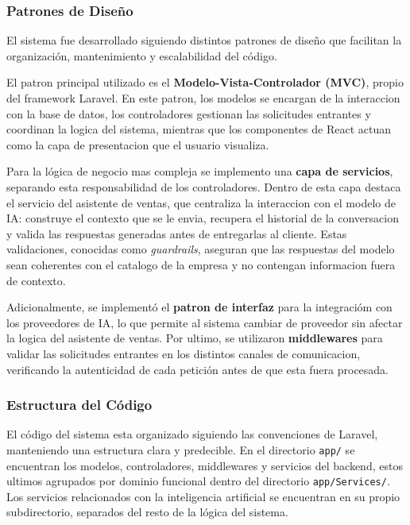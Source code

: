 \subsubsection{Patrones de Diseño}
\label{subsubsec:patrones_diseno}

El sistema fue desarrollado siguiendo distintos patrones de diseño que facilitan la organización, mantenimiento y escalabilidad del código.

El patron principal utilizado es el \textbf{Modelo-Vista-Controlador (MVC)}, propio del framework Laravel. En este patron, los modelos se encargan de la interaccion con la base de datos, los controladores gestionan las solicitudes entrantes y coordinan la logica del sistema, mientras que los componentes de React actuan como la capa de presentacion que el usuario visualiza.

Para la lógica de negocio mas compleja se implemento una \textbf{capa de servicios}, separando esta responsabilidad de los controladores. Dentro de esta capa destaca el servicio del asistente de ventas, que centraliza la interaccion con el modelo de IA: construye el contexto que se le envia, recupera el historial de la conversacion y valida las respuestas generadas antes de entregarlas al cliente. Estas validaciones, conocidas como \textit{guardrails}, aseguran que las respuestas del modelo sean coherentes con el catalogo de la empresa y no contengan informacion fuera de contexto.

Adicionalmente, se implementó el \textbf{patron de interfaz} para la integracióm con los proveedores de IA, lo que permite al sistema cambiar de proveedor sin afectar la logica del asistente de ventas. Por ultimo, se utilizaron \textbf{middlewares} para validar las solicitudes entrantes en los distintos canales de comunicacion, verificando la autenticidad de cada petición antes de que esta fuera procesada.

\subsubsection{Estructura del Código}
\label{subsubsec:estructura_codigo}

El código del sistema esta organizado siguiendo las convenciones de Laravel, manteniendo una estructura clara y predecible. En el directorio \texttt{app/} se encuentran los modelos, controladores, middlewares y servicios del backend, estos ultimos agrupados por dominio funcional dentro del directorio \texttt{app/Services/}. Los servicios relacionados con la inteligencia artificial se encuentran en su propio subdirectorio, separados del resto de la lógica del sistema.

